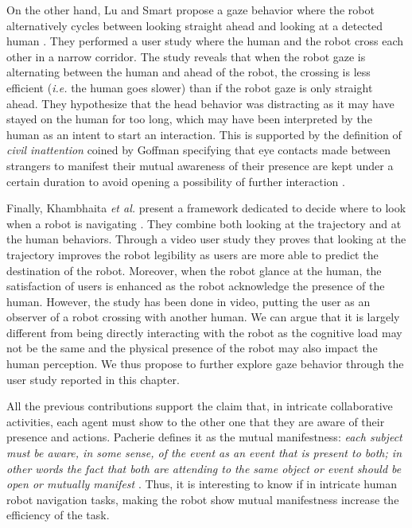 \documentclass[a4paper,11pt,twoside]{StyleThese}
\begin{document}
On the other hand, Lu and Smart propose a gaze behavior where the robot alternatively cycles between looking straight ahead and looking at a detected human \cite{lu_towards_2013}. They performed a user study where the human and the robot cross each other in a narrow corridor. The study reveals that when the robot gaze is alternating between the human and ahead of the robot, the crossing is less efficient (\textit{i.e.} the human goes slower) than if the robot gaze is only straight ahead. They hypothesize that the head behavior was distracting as it may have stayed on the human for too long, which may have been interpreted by the human as an intent to start an interaction. This is supported by the definition of \textit{civil inattention} coined by Goffman specifying that eye contacts made between strangers to manifest their mutual awareness of their presence are kept under a certain duration to avoid opening a possibility of further interaction \cite{goffman_behavior_1966}.

Finally, Khambhaita \textit{et al.} present a framework dedicated to decide where to look when a robot is navigating \cite{khambhaita_head-body_2016}. They combine both looking at the trajectory and at the human behaviors. Through a video user study they proves that looking at the trajectory improves the robot legibility as users are more able to predict the destination of the robot. Moreover, when the robot glance at the human, the satisfaction of users is enhanced as the robot acknowledge the presence of the human. However, the study has been done in video, putting the user as an observer of a robot crossing with another human. We can argue that it is largely different from being directly interacting with the robot as the cognitive load may not be the same and the physical presence of the robot may also impact the human perception. We thus propose to further explore gaze behavior through the user study reported in this chapter.

All the previous contributions support the claim that, in intricate collaborative activities, each agent must show to the other one that they are aware of their presence and actions. Pacherie defines it as the mutual manifestness: \textit{each subject must be aware, in some sense, of the event as an event that is present to both; in other words the fact that both are attending to the same object or event should be open or mutually manifest} \cite{pacherie_phenomenology_2011}. Thus, it is interesting to know if in intricate human robot navigation tasks, making the robot show mutual manifestness increase the efficiency of the task.
\end{document}
